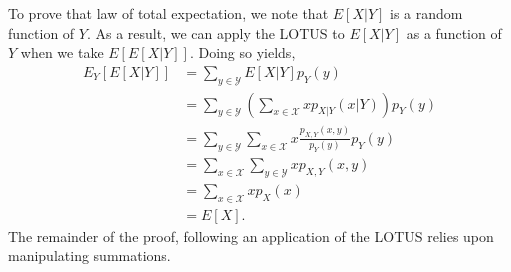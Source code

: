 \documentclass[
  letterpaper,
  DIV=11,
  numbers=noendperiod]{scrreprt}
\theoremstyle{definition}
\theoremstyle{definition}
\theoremstyle{definition}
\theoremstyle{remark}
\begin{document}
\begin{tcolorbox}[enhanced jigsaw, coltitle=black, colframe=quarto-callout-warning-color-frame, colbacktitle=quarto-callout-warning-color!10!white, bottomrule=.15mm, opacitybacktitle=0.6, colback=white, toptitle=1mm, arc=.35mm, leftrule=.75mm, bottomtitle=1mm, opacityback=0, breakable, rightrule=.15mm, title={Proof of the Law of Total Expectation}, left=2mm, titlerule=0mm, toprule=.15mm]

To prove that law of total expectation, we note that \(E[X|Y]\) is a
random function of \(Y\). As a result, we can apply the LOTUS to
\(E[X|Y]\) as a function of \(Y\) when we take \(E[E[X|Y]]\). Doing so
yields, \begin{align*}
E_Y[E[X|Y]] &= \sum_{y\in\mathcal{Y}} E[X|Y]p_Y(y) \\
&= \sum_{y\in\mathcal{Y}}\left(\sum_{x\in\mathcal{X}}xp_{X|Y}(x|Y)\right)p_Y(y) \\
&= \sum_{y\in\mathcal{Y}}\sum_{x\in\mathcal{X}}x\frac{p_{X,Y}(x,y)}{p_Y(y)}p_Y(y)\\
&= \sum_{x\in\mathcal{X}}\sum_{y\in\mathcal{Y}}xp_{X,Y}(x,y)\\
&= \sum_{x\in\mathcal{X}} xp_X(x)\\
&= E[X].\end{align*} The remainder of the proof, following an
application of the LOTUS relies upon manipulating summations.

\end{tcolorbox}
\end{document}
